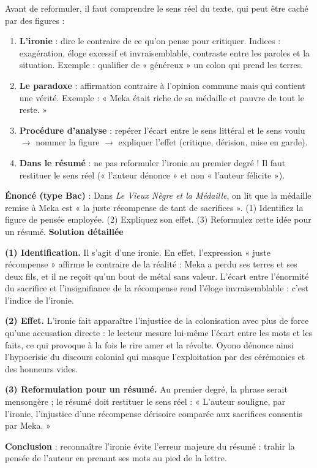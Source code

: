 \documentclass[11pt]{article}
\newcommand{\cle}[1]{{\popxbold\color{popdark}#1}}
\begin{document}
\begin{methode}
Avant de reformuler, il faut comprendre le sens réel du texte, qui peut être caché par des figures :
\begin{enumerate}
\item \textbf{L'\cle{ironie}} : dire le contraire de ce qu'on pense pour critiquer. Indices : exagération, éloge excessif et invraisemblable, contraste entre les paroles et la situation. Exemple : qualifier de « généreux » un colon qui prend les terres.
\item \textbf{Le \cle{paradoxe}} : affirmation contraire à l'opinion commune mais qui contient une vérité. Exemple : « Meka était riche de sa médaille et pauvre de tout le reste. »
\item \textbf{Procédure d'analyse} : repérer l'écart entre le sens littéral et le sens voulu $\rightarrow$ nommer la figure $\rightarrow$ expliquer l'effet (critique, dérision, mise en garde).
\item \textbf{Dans le résumé} : ne pas reformuler l'ironie au premier degré ! Il faut restituer le sens réel (« l'auteur dénonce » et non « l'auteur félicite »).
\end{enumerate}
\end{methode}

\begin{exoresolu}
\textbf{Énoncé (type Bac)} : Dans \emph{Le Vieux Nègre et la Médaille}, on lit que la médaille remise à Meka est « la juste récompense de tant de sacrifices ». (1) Identifiez la figure de pensée employée. (2) Expliquez son effet. (3) Reformulez cette idée pour un résumé.
\tcblower
\textbf{Solution détaillée}

\textbf{(1) Identification.} Il s'agit d'une \cle{ironie}. En effet, l'expression « juste récompense » affirme le contraire de la réalité : Meka a perdu ses terres et ses deux fils, et il ne reçoit qu'un bout de métal sans valeur. L'écart entre l'énormité du sacrifice et l'insignifiance de la récompense rend l'éloge invraisemblable : c'est l'indice de l'ironie.

\textbf{(2) Effet.} L'ironie fait apparaître l'injustice de la colonisation avec plus de force qu'une accusation directe : le lecteur mesure lui-même l'écart entre les mots et les faits, ce qui provoque à la fois le rire amer et la révolte. Oyono dénonce ainsi l'hypocrisie du discours colonial qui masque l'exploitation par des cérémonies et des honneurs vides.

\textbf{(3) Reformulation pour un résumé.} Au premier degré, la phrase serait mensongère ; le résumé doit restituer le sens réel : « L'auteur souligne, par l'ironie, l'injustice d'une récompense dérisoire comparée aux sacrifices consentis par Meka. »

\textbf{Conclusion} : reconnaître l'ironie évite l'erreur majeure du résumé : trahir la pensée de l'auteur en prenant ses mots au pied de la lettre.
\end{exoresolu}
\end{document}
